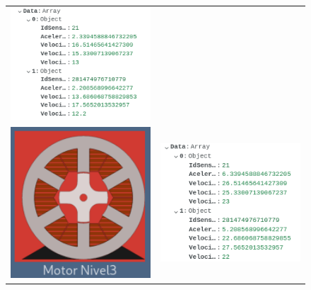 \documentclass[12pt]{article}
\begin{document}
\begin{refsegment}
\begin{figure}[H]
\begin{tabular}{m{6cm}m{6cm}}
            \includegraphics[width=6cm]{comprobacion_resultados/finales/n2mongo.png}\\
            \includegraphics[width=6cm]{comprobacion_resultados/finales/n3.png}&
            \includegraphics[width=6cm]{comprobacion_resultados/finales/n3mongo.png}
        \end{tabular}
        \label{img:NivelesMotores}
    \end{figure}


\end{refsegment}
\end{document}
